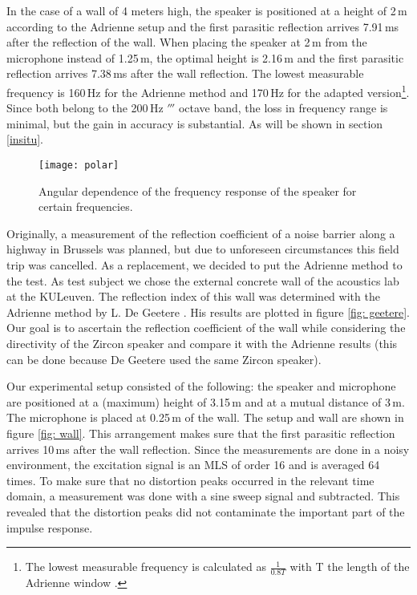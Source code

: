 In the case of a wall of 4 meters high, the speaker is positioned at a height of 2\,m according to the Adrienne setup and the first parasitic reflection arrives 7.91\,ms after the reflection of the wall. When placing the speaker at 2\,m from the microphone instead of 1.25\,m, the optimal height is 2.16\,m and the first parasitic reflection arrives 7.38\,ms after the wall reflection. The lowest measurable frequency is 160\,Hz for the Adrienne method and 170\,Hz for the adapted version\footnote{The lowest measurable frequency is calculated as $\frac{1}{0.8 T}$ with T the length of the Adrienne window \cite[p.70]{Geetere}.}. Since both belong to the 200\,Hz $\third$ octave band, the loss in frequency range is minimal, but the gain in accuracy is substantial. As will be shown in section \ref{insitu}.





\begin{wrapfigure}{r}[0.08\textwidth]{0.40\textwidth}
  \centering
    \texttt{[image: polar]}
  \caption{Angular dependence of the frequency response of the speaker for certain frequencies.}
  \label{fig: polar}
\end{wrapfigure}



Originally, a measurement of the reflection coefficient of a noise barrier along a highway in Brussels was planned, but due to unforeseen circumstances this field trip was cancelled. As a replacement, we decided to put the Adrienne method to the test. As test subject we chose the external concrete wall of the acoustics lab at the KULeuven. The reflection index of this wall was determined with the Adrienne method by L. De Geetere \cite[p.68]{Geetere}. His results are plotted in figure \ref{fig: geetere}. Our goal is to ascertain the reflection coefficient of the wall while considering the directivity of the Zircon speaker and compare it with the Adrienne results (this can be done because De Geetere used the same Zircon speaker). 




Our experimental setup consisted of the following: the speaker and microphone are positioned at a (maximum) height of 3.15\,m and at a mutual distance of 3\,m. The microphone is placed at 0.25\,m of the wall. The setup and wall are shown in figure \ref{fig: wall}. This arrangement makes sure that the first parasitic reflection arrives 10\,ms after the wall reflection. Since the measurements are done in a noisy environment, the excitation signal is an MLS of order 16 and is averaged 64 times. To make sure that no distortion peaks occurred in the relevant time domain, a measurement was done with a sine sweep signal and subtracted. This revealed that the distortion peaks did not contaminate the important part of the impulse response. 


